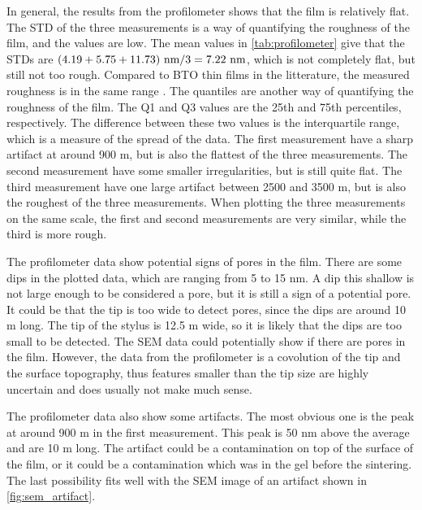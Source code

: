 \noindent In general, the results from the profilometer shows that the film is relatively flat.
The STD of the three measurements is a way of quantifying the roughness of the film, and the values are low.
The mean values in \autoref{tab:profilometer} give that the STDs are $(4.19 + 5.75 + 11.73) \textnormal{ nm} / 3  = 7.22 \textnormal{ nm}$, which is not completely flat, but still not too rough. %
Compared to BTO thin films in the litterature, the measured roughness is in the same range \cite{george_preferentially_2013}.
The quantiles are another way of quantifying the roughness of the film.
The Q1 and Q3 values are the 25th and 75th percentiles, respectively.
The difference between these two values is the interquartile range, which is a measure of the spread of the data.
The first measurement have a sharp artifact at around 900 \textmu m, but is also the flattest of the three measurements.
The second measurement have some smaller irregularities, but is still quite flat.
The third measurement have one large artifact between 2500 and 3500 \textmu m, but is also the roughest of the three measurements.
When plotting the three measurements on the same scale, the first and second measurements are very similar, while the third is more rough.

The profilometer data show potential signs of pores in the film.
There are some dips in the plotted data, which are ranging from 5 to 15 nm.
A dip this shallow is not large enough to be considered a pore, but it is still a sign of a potential pore.
It could be that the tip is too wide to detect pores, since the dips are around 10 \textmu m long.
The tip of the stylus is 12.5 \textmu m wide, so it is likely that the dips are too small to be detected.
The SEM data could potentially show if there are pores in the film.
However, the data from the profilometer is a covolution of the tip and the surface topography, thus features smaller than the tip size are highly uncertain and does usually not make much sense.

The profilometer data also show some artifacts.
The most obvious one is the peak at around 900 \textmu m in the first measurement.
This peak is 50 nm above the average and are 10 \textmu m long.
The artifact could be a contamination on top of the surface of the film, or it could be a contamination which was in the gel before the sintering.
The last possibility fits well with the SEM image of an artifact shown in \autoref{fig:sem_artifact}.

